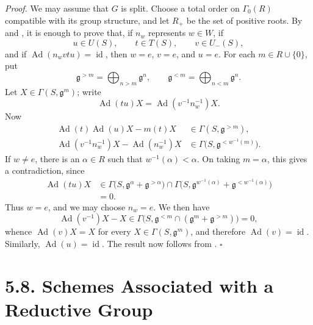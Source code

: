 \textit{Proof.}
We may assume that \(G\) is split. Choose a total order on
\(\Gamma_0(R)\) compatible with its group structure, and let
\(R_+\) be the set of positive roots. By  \textup{} and
, it is enough to prove that, if \(n_w\) represents
\(w\in W\), if
\[
  u\in U(S),\qquad t\in T(S),\qquad v\in U_-(S),
\]
and if \(\operatorname{Ad}(n_wvtu)=\operatorname{id}\), then
\(w=e\), \(v=e\), and \(u=e\). For each \(m\in R\cup\{0\}\), put
\[
  \mathfrak g^{>m}
  =
  \bigoplus_{n>m}\mathfrak g^n,
  \qquad
  \mathfrak g^{<m}
  =
  \bigoplus_{n<m}\mathfrak g^n.
\]
Let \(X\in\Gamma(S,\mathfrak g^m)\); write
\[
  \operatorname{Ad}(tu)X
  =
  \operatorname{Ad}(v^{-1}n_w^{-1})X.
\]
Now
\[
\begin{aligned}
  \operatorname{Ad}(t)\operatorname{Ad}(u)X-m(t)X
  &\in\Gamma(S,\mathfrak g^{>m}),\\
  \operatorname{Ad}(v^{-1}n_w^{-1})X
  -\operatorname{Ad}(n_w^{-1})X
  &\in\Gamma\bigl(S,\mathfrak g^{<w^{-1}(m)}\bigr).
\end{aligned}
\]
If \(w\ne e\), there is an \(\alpha\in R\) such that
\(w^{-1}(\alpha)<\alpha\). On taking \(m=\alpha\), this gives a
contradiction, since
\[
\begin{aligned}
  \operatorname{Ad}(tu)X
  &\in
  \Gamma\bigl(S,\mathfrak g^\alpha+\mathfrak g^{>\alpha}\bigr)
  \cap
  \Gamma\bigl(
    S,
    \mathfrak g^{w^{-1}(\alpha)}
    +\mathfrak g^{<w^{-1}(\alpha)}
  \bigr)\\
  &=0.
\end{aligned}
\]
Thus \(w=e\), and we may choose \(n_w=e\). We then have
\[
  \operatorname{Ad}(v^{-1})X-X
  \in
  \Gamma\bigl(
    S,
    \mathfrak g^{<m}\cap
    (\mathfrak g^m+\mathfrak g^{>m})
  \bigr)
  =0,
\]
whence \(\operatorname{Ad}(v)X=X\) for every
\(X\in\Gamma(S,\mathfrak g^m)\), and therefore
\(\operatorname{Ad}(v)=\operatorname{id}\). Similarly,
\(\operatorname{Ad}(u)=\operatorname{id}\). The result now follows
from .
\hfill\(\square\)

\section*{5.8. Schemes Associated with a Reductive Group}

